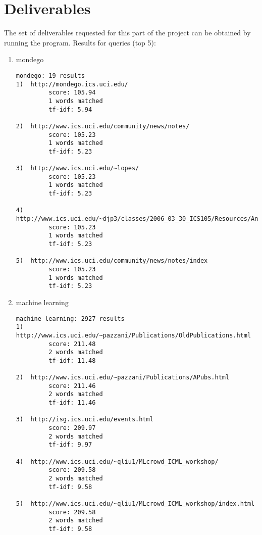 \documentclass[paper=a4, fontsize=11pt]{scrartcl} %
\numberwithin{equation}{section} %
\numberwithin{table}{section} %
\begin{document}
\section*{Deliverables}
The set of deliverables requested for this part of the project can be obtained by running the program. Results for queries (top 5):
\begin{enumerate}
\item mondego
\begin{small}
\begin{verbatim}
mondego: 19 results
1)  http://mondego.ics.uci.edu/ 
         score: 105.94 
         1 words matched 
         tf-idf: 5.94

2)  http://www.ics.uci.edu/community/news/notes/ 
         score: 105.23 
         1 words matched 
         tf-idf: 5.23

3)  http://www.ics.uci.edu/~lopes/ 
         score: 105.23 
         1 words matched 
         tf-idf: 5.23

4)  http://www.ics.uci.edu/~djp3/classes/2006_03_30_ICS105/Resources/AnteaterIdol.html 
         score: 105.23 
         1 words matched 
         tf-idf: 5.23

5)  http://www.ics.uci.edu/community/news/notes/index 
         score: 105.23 
         1 words matched 
         tf-idf: 5.23
\end{verbatim}
\end{small}
\item machine learning
\begin{small}
\begin{verbatim}
machine learning: 2927 results
1)  http://www.ics.uci.edu/~pazzani/Publications/OldPublications.html 
         score: 211.48 
         2 words matched 
         tf-idf: 11.48

2)  http://www.ics.uci.edu/~pazzani/Publications/APubs.html 
         score: 211.46 
         2 words matched 
         tf-idf: 11.46

3)  http://isg.ics.uci.edu/events.html 
         score: 209.97 
         2 words matched 
         tf-idf: 9.97

4)  http://www.ics.uci.edu/~qliu1/MLcrowd_ICML_workshop/ 
         score: 209.58 
         2 words matched 
         tf-idf: 9.58

5)  http://www.ics.uci.edu/~qliu1/MLcrowd_ICML_workshop/index.html 
         score: 209.58 
         2 words matched 
         tf-idf: 9.58


\end{verbatim}
\end{small}


\end{enumerate}
\end{document}
